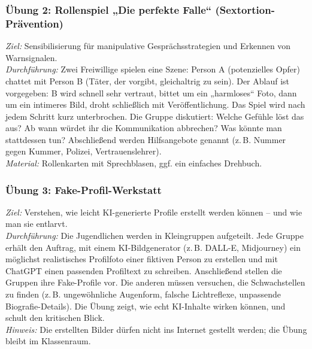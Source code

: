 \documentclass[12pt,a4paper,oneside]{scrartcl}
\begin{document}
	\subsubsection{Übung 2: Rollenspiel „Die perfekte Falle“ (Sextortion-Prävention)}
	\textit{Ziel:} Sensibilisierung für manipulative Gesprächsstrategien und Erkennen von Warnsignalen. \\
	\textit{Durchführung:} Zwei Freiwillige spielen eine Szene: Person A (potenzielles Opfer) chattet mit Person B (Täter, der vorgibt, gleichaltrig zu sein). Der Ablauf ist vorgegeben: B wird schnell sehr vertraut, bittet um ein „harmloses“ Foto, dann um ein intimeres Bild, droht schließlich mit Veröffentlichung. Das Spiel wird nach jedem Schritt kurz unterbrochen. Die Gruppe diskutiert: Welche Gefühle löst das aus? Ab wann würdet ihr die Kommunikation abbrechen? Was könnte man stattdessen tun? Abschließend werden Hilfsangebote genannt (z.\,B. Nummer gegen Kummer, Polizei, Vertrauenslehrer). \\
	\textit{Material:} Rollenkarten mit Sprechblasen, ggf. ein einfaches Drehbuch.
	
	\subsubsection{Übung 3: Fake-Profil-Werkstatt}
	\textit{Ziel:} Verstehen, wie leicht KI-generierte Profile erstellt werden können – und wie man sie entlarvt. \\
	\textit{Durchführung:} Die Jugendlichen werden in Kleingruppen aufgeteilt. Jede Gruppe erhält den Auftrag, mit einem KI-Bildgenerator (z.\,B. DALL-E, Midjourney) ein möglichst realistisches Profilfoto einer fiktiven Person zu erstellen und mit ChatGPT einen passenden Profiltext zu schreiben. Anschließend stellen die Gruppen ihre Fake-Profile vor. Die anderen müssen versuchen, die Schwachstellen zu finden (z.\,B. ungewöhnliche Augenform, falsche Lichtreflexe, unpassende Biografie-Details). Die Übung zeigt, wie echt KI-Inhalte wirken können, und schult den kritischen Blick. \\
	\textit{Hinweis:} Die erstellten Bilder dürfen nicht ins Internet gestellt werden; die Übung bleibt im Klassenraum.
	
\end{document}
